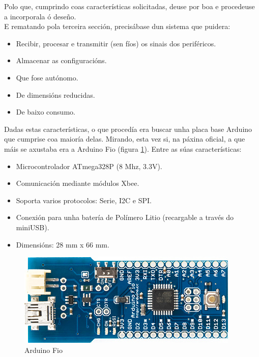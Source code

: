   Polo que, cumprindo coas características solicitadas, deuse por boa e
  procedeuse a incorporala ó deseño. \\

  E rematando pola terceira sección, precisábase dun sistema que puidera:

  \begin{itemize}
   \item Recibir, procesar e transmitir (sen fíos) os sinais dos periféricos.
   \item Almacenar as configuracións.
   \item Que fose autónomo.
   \item De dimensións reducidas.
   \item De baixo consumo.
  \end{itemize}

  Dadas estas características, o que procedía era buscar unha placa base
  Arduino que cumprise coa maioría delas. Mirando, esta vez si, na páxina
  oficial, a que máis se axustaba era a Arduino Fio \cite{ArduinoFio} (figura
  \ref{figura:ArduinoFio}). Entre as súas características:

  \begin{itemize}
   \item Microcontrolador ATmega328P (8 Mhz, 3.3V).
   \item Comunicación mediante módulos Xbee.
   \item Soporta varios protocolos: Serie, I2C e SPI.
   \item Conexión para unha batería de Polímero Litio (recargable a través do
         miniUSB).
   \item Dimensións: 28 mm x 66 mm.
  \end{itemize}

  \begin{figure}[htbp]
   \centering
   \includegraphics[scale=0.6,keepaspectratio=true]{./imagenes/arduino-fio.jpg}
   \caption{Arduino Fio}
   \label{figura:ArduinoFio}
  \end{figure}


